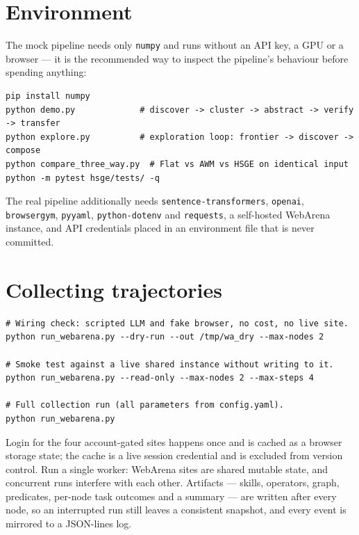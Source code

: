 \section{Environment}
\label{app:repro-env}

The mock pipeline needs only \texttt{numpy} and runs without an API key, a GPU
or a browser --- it is the recommended way to inspect the pipeline's behaviour
before spending anything:

\begin{lstlisting}[style=mystyle,numbers=none,basicstyle=\scriptsize\ttfamily]
pip install numpy
python demo.py             # discover -> cluster -> abstract -> verify -> transfer
python explore.py          # exploration loop: frontier -> discover -> compose
python compare_three_way.py  # Flat vs AWM vs HSGE on identical input
python -m pytest hsge/tests/ -q
\end{lstlisting}

\noindent
The real pipeline additionally needs \texttt{sentence-transformers},
\texttt{openai}, \texttt{browsergym}, \texttt{pyyaml},
\texttt{python-dotenv} and \texttt{requests}, a self-hosted WebArena
instance, and API credentials placed in an environment file that is never
committed.

\section{Collecting trajectories}
\label{app:repro-collect}

\begin{lstlisting}[style=mystyle,numbers=none,basicstyle=\scriptsize\ttfamily]
# Wiring check: scripted LLM and fake browser, no cost, no live site.
python run_webarena.py --dry-run --out /tmp/wa_dry --max-nodes 2

# Smoke test against a live shared instance without writing to it.
python run_webarena.py --read-only --max-nodes 2 --max-steps 4

# Full collection run (all parameters from config.yaml).
python run_webarena.py
\end{lstlisting}

\noindent
Login for the four account-gated sites happens once and is cached as a browser
storage state; the cache is a live session credential and is excluded from
version control. Run a single worker: WebArena sites are shared mutable state,
and concurrent runs interfere with each other. Artifacts --- skills, operators,
graph, predicates, per-node task outcomes and a summary --- are written after
every node, so an interrupted run still leaves a consistent snapshot, and every
event is mirrored to a JSON-lines log.

